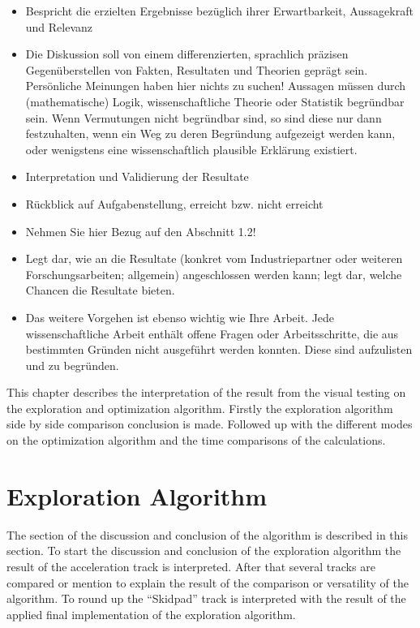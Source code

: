 \begin{itemize}
    \item Bespricht die erzielten Ergebnisse bezüglich ihrer Erwartbarkeit, Aussagekraft und Relevanz
    \item Die Diskussion soll von einem differenzierten, sprachlich präzisen Gegenüberstellen von Fakten, Resultaten und Theorien geprägt sein. Persönliche Meinungen haben hier nichts zu suchen! Aussagen müssen durch (mathematische) Logik, wissenschaftliche Theorie oder Statistik begründbar sein. Wenn Vermutungen nicht begründbar sind, so sind diese nur dann festzuhalten, wenn ein Weg zu deren Begründung aufgezeigt werden kann, oder wenigstens eine wissenschaftlich plausible Erklärung existiert.
    \item Interpretation und Validierung der Resultate
    \item Rückblick auf Aufgabenstellung, erreicht bzw. nicht erreicht
    \item Nehmen Sie hier Bezug auf den Abschnitt 1.2!
    \item Legt dar, wie an die Resultate (konkret vom Industriepartner oder weiteren Forschungsarbeiten; allgemein) angeschlossen werden kann; legt dar, welche Chancen die Resultate bieten.
    \item Das weitere Vorgehen ist ebenso wichtig wie Ihre Arbeit. Jede wissenschaftliche Arbeit enthält offene Fragen oder Arbeitsschritte, die aus bestimmten Gründen nicht ausgeführt werden konnten. Diese sind aufzulisten und zu begründen.
\end{itemize}
This chapter describes the interpretation of the result from the visual testing on the exploration and optimization algorithm. Firstly the exploration algorithm side by side comparison conclusion is made. Followed up with the different modes on the optimization algorithm and the time comparisons of the calculations.

\section{Exploration Algorithm}
The section of the discussion and conclusion of the algorithm is described in this section. To start the discussion and conclusion of the exploration algorithm the result of the acceleration track is interpreted. After that several tracks are compared or mention to explain the result of the comparison or versatility of the algorithm. To round up the ``Skidpad'' track is interpreted with the result of the applied final implementation of the exploration algorithm.

